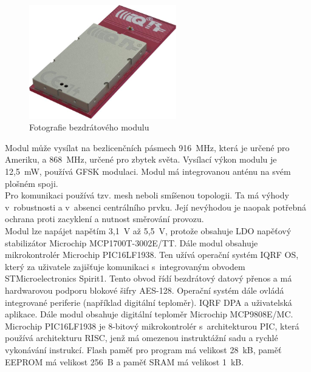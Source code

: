 \documentclass[12pt,a4paper,oneside]{article}
\begin{document}
\begin{figure}[H]
\centering
\label{fig:iqrf/fotka}
\includegraphics[width = 64mm]{../img/iqrf/dctr-72dat.png}
\caption{Fotografie bezdrátového modulu}
\end{figure}

Modul může vysílat na bezlicenčních pásmech 916~MHz, která je určené pro Ameriku, a 868~MHz, určené pro zbytek světa. Vysílací výkon modulu je 12,5~mW, používá GFSK modulaci. Modul má integrovanou anténu na svém plošném spoji. \\

Pro komunikaci používá tzv. mesh neboli smíšenou topologii. Ta má výhody v~robustnosti a v~absenci centrálního prvku. Její nevýhodou je naopak potřebná ochrana proti zacyklení a nutnost směrování provozu. \\

Modul lze napájet napětím 3,1~V až 5,5~V, protože obsahuje LDO napěťový stabilizátor Microchip MCP1700T-3002E/TT. Dále modul obsahuje mikrokontrolér Microchip PIC16LF1938. Ten užívá operační systém IQRF OS, který za uživatele zajišťuje komunikaci s~integrovaným obvodem STMicroelectronics Spirit1. Tento obvod řídí bezdrátový datový přenos a má hardwarovou podporu blokové šifry AES-128. Operační systém dále ovládá integrované periferie (například digitální teploměr). IQRF DPA a uživatelská aplikace. Dále modul obsahuje digitální teploměr Microchip MCP9808E/MC. \\

Microchip PIC16LF1938 je 8-bitový mikrokontrolér s~architekturou PIC, která používá architekturu RISC, jenž má omezenou instruktážní sadu a rychlé vykonávání instrukcí. Flash paměť pro program má velikost 28~kB, paměť EEPROM má velikost 256~B a paměť SRAM má velikost 1~kB.
\end{document}

